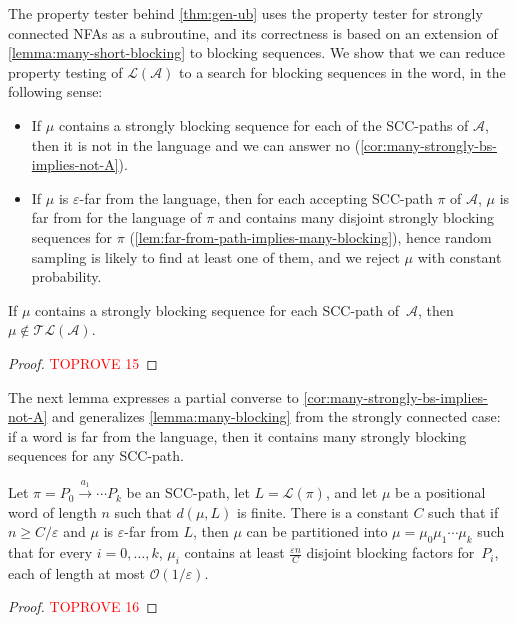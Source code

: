 \documentclass[letterpaper, USenglish, cleveref, autoref, thm-restate, numberwithinsect]{lipics-v2021}
\theoremstyle{theorem}
\theoremstyle{definition}
\newcommand{\Aa}{\mathcal{A}}
\newcommand{\cO}{\mathcal{O}}
\newcommand{\eps}{\varepsilon}
\newcommand{\lang}[1]{\mathcal{L}(#1)}
\newcommand{\SCCpath}{\pi}
\newcommand{\timedlang}[1]{\mathcal{TL}( #1 )}
\begin{document}
The property tester behind \cref{thm:gen-ub} uses the property tester for strongly connected NFAs as a subroutine, and its correctness is based on an extension of \cref{lemma:many-short-blocking} to blocking sequences.
We show that we can reduce property testing of $\lang{\Aa}$ to a search for blocking sequences in the word, in the following sense:
\begin{itemize}
	\item If $\mu$ contains a strongly blocking sequence for each of the SCC-paths of $\Aa$, then it is not in the language and we can answer no (\cref{cor:many-strongly-bs-implies-not-A}).
	\item If $\mu$ is $\eps$-far from the language, then for each accepting SCC-path $\SCCpath$ of $\Aa$, $\mu$ is far from for the language of $\SCCpath$ and contains many disjoint strongly blocking sequences for $\SCCpath$ (\cref{lem:far-from-path-implies-many-blocking}), hence random sampling is likely to find at least one of them, and we reject $\mu$ with constant probability.
\end{itemize}

\begin{corollary}
	\label{cor:many-strongly-bs-implies-not-A}
	If $\mu$ contains a strongly blocking sequence for each SCC-path of~$\Aa$, then $\mu \notin \timedlang{\Aa}$.
\end{corollary}
\begin{proof}\textcolor{red}{TOPROVE 15}\end{proof}

The next lemma expresses a partial converse to \cref{cor:many-strongly-bs-implies-not-A} and generalizes \cref{lemma:many-blocking} from the strongly connected case: if a word is far from the language, then it contains many strongly blocking sequences for any SCC-path.
\begin{lemma}
    \label{lem:far-from-path-implies-many-blocking}
    Let $\SCCpath  = P_0 \xrightarrow{a_1} \cdots  P_k$ be an SCC-path, let $L = \lang{\SCCpath}$, and let $\mu$ be a positional word of length $n$ such that $d(\mu, L)$ is finite.
    There is a constant $C$ such that if $n \geq C/\eps$
    and $\mu$ is $\eps$-far from $L$, then $\mu$ can be partitioned into $\mu = \mu_0\mu_1\cdots\mu_k$ such that for every $i = 0,\ldots, k$,
    $\mu_i$ contains at least $\frac{\eps n}{C}$ disjoint blocking factors for~$P_i$, each of length at most $\cO(1/\eps)$.
\end{lemma}
\begin{proof}\textcolor{red}{TOPROVE 16}\end{proof}
\end{document}
